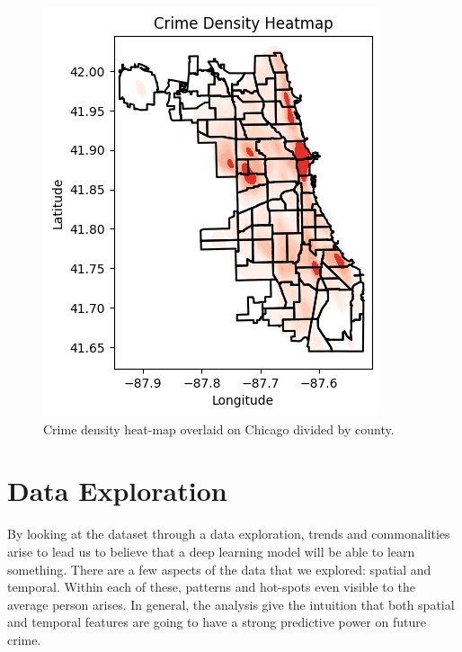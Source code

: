 \documentclass{article}
\begin{document}
\begin{figure}[h]
    \centering
    \includegraphics[width=0.5\linewidth]{deep-learning-im/crime-heatmap.png}
    \caption{Crime density heat-map overlaid on Chicago divided by county.}
    \label{fig:crime-heatmap}
\end{figure}

\section{Data Exploration}

By looking at the dataset through a data exploration, trends and commonalities arise to lead us to believe that a deep learning model will be able to learn something. There are a few aspects of the data that we explored: spatial and temporal. Within each of these, patterns and hot-spots even visible to the average person arises. In general, the analysis give the intuition that both spatial and temporal features are going to have a strong predictive power on future crime.
\end{document}
